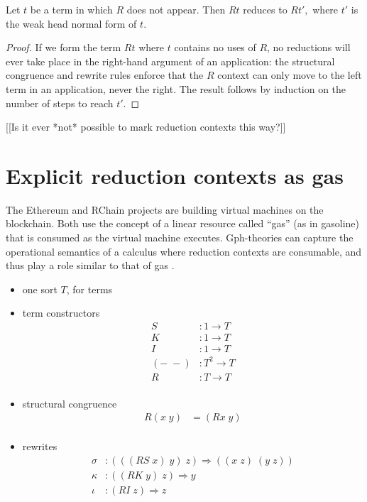 \documentclass[a4paper,UKenglish]{lipics-v2016}
\begin{document}
\begin{theorem}
  Let $t$ be a term in which $R$ does not appear.  Then $Rt$ reduces to $Rt',$ where $t'$ is the weak head normal form of $t.$
\end{theorem}

\begin{proof}
If we form the term $Rt$ where $t$ contains no uses of $R$, no reductions will ever take place in the right-hand argument of an application: the structural congruence and rewrite rules enforce that the $R$ context can only move to the left term in an application, never the right.  The result follows by induction on the number of steps to reach $t'.$
\end{proof}

[[Is it ever *not* possible to mark reduction contexts this way?]]

\section{Explicit reduction contexts as gas}
The Ethereum \cite{wood2014ethereum} and RChain \cite{RChain} projects are building virtual machines on the blockchain.  Both use the concept of a linear resource called ``gas'' (as in gasoline) that is consumed as the virtual machine executes.  Gph-theories can capture the operational semantics of a calculus where reduction contexts are consumable, and thus play a role similar to that of gas \cite{DBLP:journals/corr/StayM15}.

\begin{itemize}
  \item one sort $T$, for terms
  \item term constructors
  \[\begin{array}{rl}
    S&:1 \to T\\
    K&:1 \to T\\
    I&:1 \to T\\
    (-\; -)&: T^2 \to T\\
    R&:T \to T\\
  \end{array}\]
  \item structural congruence
  \[\begin{array}{rl}
    R(x\; y) &= (Rx\; y)\\
  \end{array}\]
  \item rewrites
  \[\begin{array}{rl}
    \sigma&:(((RS\; x)\; y)\; z) \Rightarrow ((x\; z)\; (y\; z))\\
    \kappa&:((RK\; y)\; z) \Rightarrow y\\
    \iota&:(RI\; z) \Rightarrow z\\
  \end{array}\]
\end{itemize}
\end{document}
